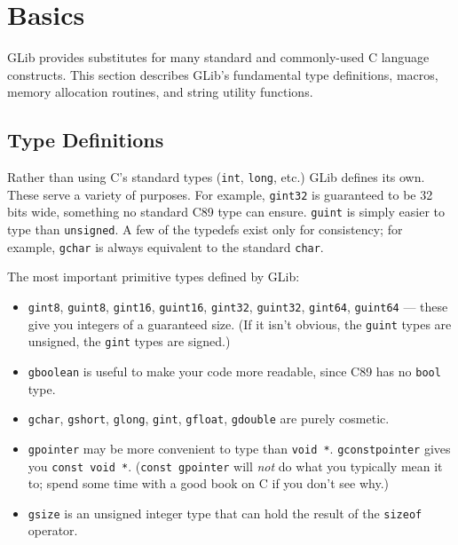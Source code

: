\section{Basics}

GLib provides substitutes for many standard and commonly-used C language constructs. This section describes GLib's fundamental type definitions, macros, memory allocation routines, and string utility functions.

\subsection{Type Definitions}

Rather than using C's standard types (\lstinline{int}, \lstinline{long}, etc.) GLib defines its own. These serve a variety of purposes. For example, \lstinline{gint32} is guaranteed to be 32 bits wide, something no standard C89 type can ensure. \lstinline{guint} is simply easier to type than \lstinline{unsigned}. A few of the typedefs exist only for consistency; for example, \lstinline{gchar} is always equivalent to the standard \lstinline{char}.

The most important primitive types defined by GLib:
\begin{itemize}
  \item \lstinline{gint8}, \lstinline{guint8}, \lstinline{gint16}, \lstinline{guint16}, \lstinline{gint32}, \lstinline{guint32}, \lstinline{gint64}, \lstinline{guint64} --- these give you integers of a guaranteed size. (If it isn't obvious, the \lstinline{guint} types are unsigned, the \lstinline{gint} types are signed.)

  \item \lstinline{gboolean} is useful to make your code more readable, since C89 has no \lstinline{bool} type.

  \item \lstinline{gchar}, \lstinline{gshort}, \lstinline{glong}, \lstinline{gint}, \lstinline{gfloat}, \lstinline{gdouble} are purely cosmetic.

  \item \lstinline{gpointer} may be more convenient to type than \lstinline{void *}. \lstinline{gconstpointer} gives you \lstinline{const void *}. (\lstinline{const gpointer} will \emph{not} do what you typically mean it to; spend some time with a good book on C if you don't see why.)

  \item \lstinline{gsize} is an unsigned integer type that can hold the result of the \lstinline{sizeof} operator.
\end{itemize}

